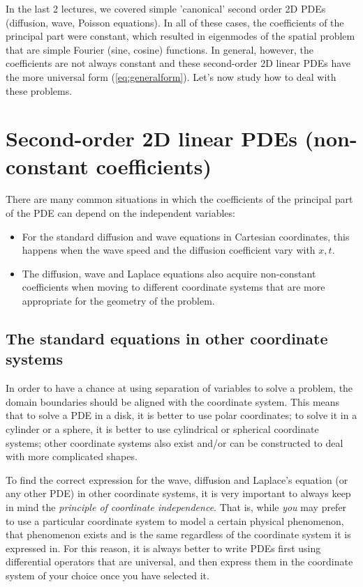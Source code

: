 In the last 2 lectures, we covered simple 'canonical' second order 2D PDEs (diffusion, wave, Poisson equations). In all of these cases, the coefficients of the principal part were constant, which resulted in eigenmodes of the spatial problem that are simple Fourier  (sine, cosine) functions. In general, however, the coefficients are not always constant and these second-order 2D linear PDEs have the more universal form (\ref{eq:generalform}). Let's now study how to deal with these problems.

\section{Second-order 2D linear PDEs (non-constant coefficients)}

There are many common situations in which the coefficients of the principal part of the PDE can depend on the independent variables:
\begin{itemize}
    \item For the standard diffusion and wave equations in Cartesian coordinates, this happens when the wave speed and the diffusion coefficient vary with $x,t$.
    \item The diffusion, wave and Laplace equations also acquire non-constant coefficients when moving to different coordinate systems that are more appropriate for the geometry of the problem. 
\end{itemize}

\subsection{The standard equations in other coordinate systems}

In order to have a chance at using separation of variables to solve a problem, the domain boundaries should be aligned with the coordinate system. This means that to solve a PDE in a disk, it is better to use polar coordinates; to solve it in a cylinder or a sphere, it is better to use cylindrical or spherical coordinate systems; other coordinate systems also exist and/or can be constructed to deal with more complicated shapes. 

To find the correct expression for the wave, diffusion and Laplace's equation (or any other PDE) in other coordinate systems, it is very important to always keep in mind the {\it principle of coordinate independence}. That is, while {\it you} may prefer to use a particular coordinate system to model a certain physical phenomenon, that phenomenon exists and is the same regardless of the coordinate system it is expressed in. For this reason, it is always better to write PDEs first using differential operators that are universal, and then express them in the coordinate system of your choice once you have selected it. 

